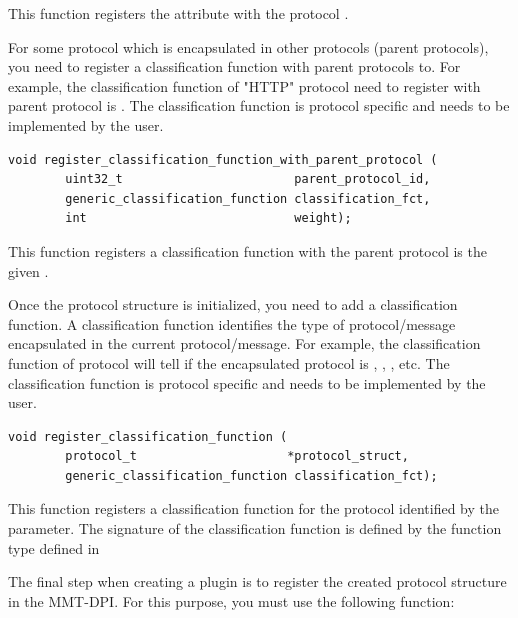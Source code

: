 This function registers the attribute  with the protocol . 

For some protocol which is encapsulated in other protocols (parent protocols), you need to register a classification function with parent protocols to. For example, the classification function of "HTTP" protocol need to register with parent protocol is . The classification function is protocol specific and needs to be implemented by the user. 

\begin{lstlisting}[style=Cpp]
void register_classification_function_with_parent_protocol (
        uint32_t                        parent_protocol_id, 
        generic_classification_function classification_fct, 
        int                             weight);
\end{lstlisting}  

This function registers a classification function  with the parent protocol is the given .

Once the protocol structure is initialized, you need to add a classification function. A classification function identifies the type of protocol/message encapsulated in the current protocol/message. For example, the classification function of  protocol will tell if the encapsulated protocol is , , , etc. The classification function is protocol specific and needs to be implemented by the user. 

\begin{lstlisting}[style=Cpp]
void register_classification_function (
        protocol_t                     *protocol_struct, 
        generic_classification_function classification_fct);
\end{lstlisting}  

This function registers a classification function  for the protocol identified by the  parameter. The signature of the classification function is defined by the function type  defined in 

The final step when creating a plugin is to register the created protocol structure in the MMT-DPI. For this purpose, you must use the following function:


